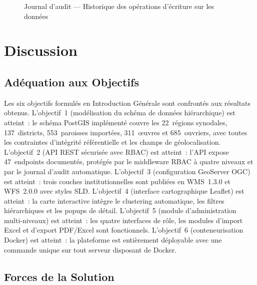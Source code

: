 \begin{figure}[H]
  \centering
  \caption{Journal d'audit --- Historique des opérations d'écriture sur les données}
  \label{fig:res-audit}
\end{figure}

\section{Discussion}
\label{sec:discussion}

\subsection{Adéquation aux Objectifs}
\label{ssec:disc-objectifs}

Les six objectifs formulés en Introduction Générale sont confrontés aux
résultats obtenus. L'objectif~1 (modélisation du schéma de données
hiérarchique) est atteint~: le schéma PostGIS implémenté couvre les
22~régions synodales, 137~districts, 553~paroisses importées, 311~œuvres
et 685~ouvriers, avec toutes les contraintes d'intégrité référentielle et
les champs de géolocalisation. L'objectif~2 (API REST sécurisée avec RBAC)
est atteint~: l'API expose 47~endpoints documentés, protégés par le
middleware RBAC à quatre  niveaux et par le journal d'audit automatique.
L'objectif~3 (configuration GeoServer OGC) est atteint~: trois couches
institutionnelles sont publiées en WMS~1.3.0 et WFS~2.0.0 avec styles SLD.
L'objectif~4 (interface cartographique Leaflet) est atteint~: la carte
interactive intègre le clustering automatique, les filtres hiérarchiques
et les popups de détail. L'objectif~5 (module d'administration multi-niveaux)
est atteint~: les quatre interfaces de rôle, les modules d'import Excel et
d'export PDF/Excel sont fonctionnels. L'objectif~6 (conteneurisation Docker)
est atteint~: la plateforme est entièrement déployable avec une commande
unique sur tout serveur disposant de Docker.

\subsection{Forces de la Solution}
\label{ssec:disc-forces}

